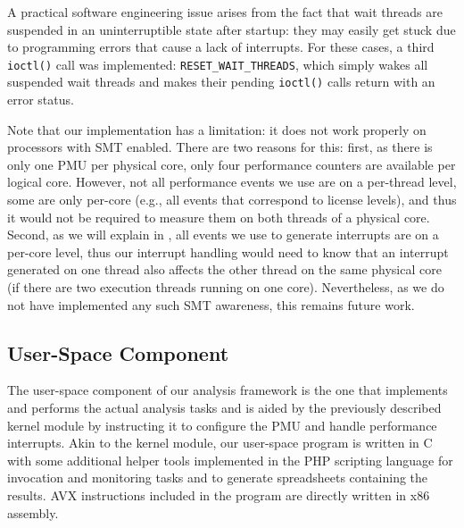 A practical software engineering issue arises from the fact that wait threads are suspended in an uninterruptible state after startup: they may easily get stuck due to programming errors that cause a lack of interrupts. For these cases, a third \texttt{ioctl()} call was implemented: \texttt{RESET\_WAIT\_THREADS}, which simply wakes all suspended wait threads and makes their pending \texttt{ioctl()} calls return with an error status.

Note that our implementation has a limitation: it does not work properly on processors with \gls{SMT} enabled. There are two reasons for this: first, as there is only one \gls{PMU} per physical core, only four performance counters are available per logical core. However, not all performance events we use are on a per-thread level, some are only per-core (e.g., all events that correspond to license levels), and thus it would not be required to measure them on both threads of a physical core. Second, as we will explain in , all events we use to generate interrupts are on a per-core level, thus our interrupt handling would need to know that an interrupt generated on one thread also affects the other thread on the same physical core (if there are two execution threads running on one core). Nevertheless, as we do not have implemented any such \gls{SMT} awareness, this remains future work.

\subsection{User-Space Component}
\label{sec:analysis:design:userspace}

The user-space component of our analysis framework is the one that implements and performs the actual analysis tasks and is aided by the previously described kernel module by instructing it to configure the \gls{PMU} and handle performance interrupts. Akin to the kernel module, our user-space program is written in C with some additional helper tools implemented in the PHP scripting language for invocation and monitoring tasks and to generate spreadsheets containing the results. \gls{AVX} instructions included in the program are directly written in \gls{x86} assembly.

